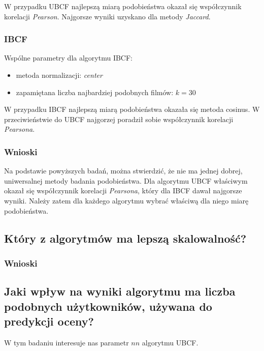 \documentclass[12pt, a4paper]{article}
\begin{document}
W przypadku UBCF najlepszą miarą podobieństwa okazał się współczynnik korelacji \emph{Pearson}. Najgorsze wyniki uzyskano dla metody \emph{Jaccard}.



\subsubsection{IBCF}
Wspólne parametry dla algorytmu IBCF:
\begin{itemize}
\item metoda normalizacji: \emph{center}
\item zapamiętana liczba najbardziej podobnych filmów: $k = 30$
\end{itemize}

W przypadku IBCF najlepszą miarą podobieństwa okazała się metoda cosinus. W przeciwieństwie do UBCF najgorzej poradził sobie współczynnik korelacji \emph{Pearsona}.



\subsubsection{Wnioski}
Na podstawie powyższych badań, można stwierdzić, że nie ma jednej dobrej, uniwersalnej metody badania podobieństwa. Dla algorytmu UBCF właściwym okazał się współczynnik korelacji \emph{Pearsona}, który dla IBCF dawał najgorsze wyniki. Należy zatem dla każdego algorytmu wybrać właściwą dla niego miarę podobieństwa.

\subsection{Który z algorytmów ma lepszą skalowalność?}

\subsubsection{Wnioski}

\subsection{Jaki wpływ na wyniki algorytmu ma liczba podobnych użytkowników, używana do predykcji oceny?}
W tym badaniu interesuje nas parametr $nn$ algorytmu UBCF. 
\end{document}

